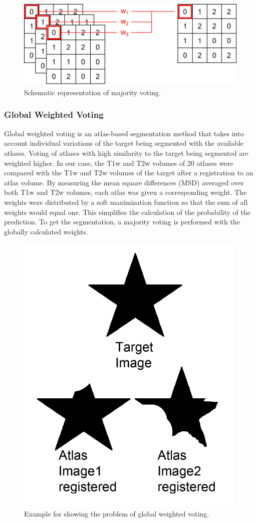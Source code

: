 \begin{figure}[h!]
	\centering
	\includegraphics[width=0.8\linewidth]{img/majorityVoting2}
	\caption{Schematic representation of majority voting.}
	\label{fig:majorityVoting}
\end{figure}

\subsubsection*{Global Weighted Voting}
Global weighted voting is an atlas-based segmentation method that takes into account individual variations of the target being segmented with the available atlases. Voting of atlases with high similarity to the target being segmented are weighted higher. In our case, the T1w and T2w volumes of 20 atlases were compared with the T1w and T2w volumes of the target after a registration to an atlas volume. By measuring the mean square differences (MSD) averaged over both T1w and T2w volumes, each atlas was given a corresponding weight.  The weights were distributed by a soft maximization function so that the sum of all weights would equal one. This simplifies the calculation of the probability of the prediction. To get the segmentation, a majority voting is performed with the globally calculated weights.

\begin{figure}[h!]
	\centering
	\includegraphics[width=0.5\linewidth]{img/globalWeightedProblematic}
	\caption{Example for showing the problem of global weighted voting\cite{b2}.}
	\label{fig:globalweightedproblematic}
\end{figure}

